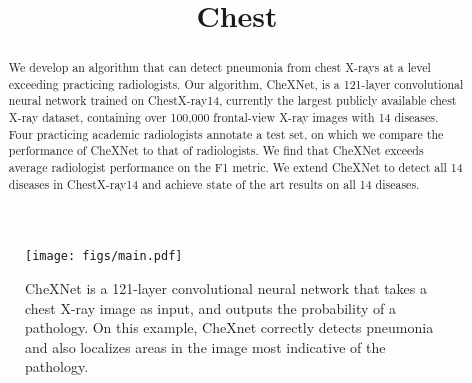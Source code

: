 \documentclass{article}
\title{Chest}
\begin{document}
 


\printAffiliationsAndNotice{\icmlEqualContribution}

\begin{abstract} 
We develop an algorithm that can detect pneumonia from chest X-rays at a level exceeding practicing radiologists. Our algorithm, CheXNet, is a 121-layer convolutional neural network trained on ChestX-ray14, currently the largest publicly available chest X-ray dataset, containing over 100,000 frontal-view X-ray images with 14 diseases. Four practicing academic radiologists annotate a test set, on which we compare the performance of CheXNet to that of radiologists. We find that CheXNet exceeds average radiologist performance on the F1 metric. We extend CheXNet to detect all 14 diseases in ChestX-ray14 and achieve state of the art results on all 14 diseases.
\end{abstract}

\begin{figure}[ht!]
  \centering
  \texttt{[image: figs/main.pdf]}
  \caption{
       CheXNet is a 121-layer convolutional neural network that takes a chest X-ray image as input, and outputs the probability of a pathology. On this example, CheXnet correctly detects pneumonia and also localizes areas in the image most indicative of the pathology.
  }
  \label{fig:system}
\end{figure}
\end{document}
